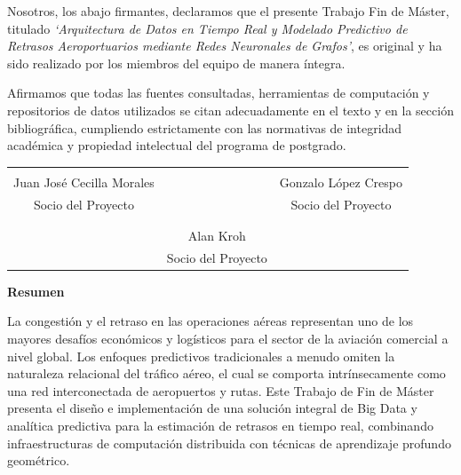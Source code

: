 \documentclass[12pt,oneside,a4paper]{report}
\renewcommand{\_}{\textunderscore\allowbreak}
\begin{document}
Nosotros, los abajo firmantes, declaramos que el presente Trabajo Fin de Máster, titulado \textit{`Arquitectura de Datos en Tiempo Real y Modelado Predictivo de Retrasos Aeroportuarios mediante Redes Neuronales de Grafos'}, es original y ha sido realizado por los miembros del equipo de manera íntegra.

Afirmamos que todas las fuentes consultadas, herramientas de computación y repositorios de datos utilizados se citan adecuadamente en el texto y en la sección bibliográfica, cumpliendo estrictamente con las normativas de integridad académica y propiedad intelectual del programa de postgrado.

\vspace{2.5cm}

\begin{center}
    \begin{tabular}{ccc}
        \underline{\hspace{5cm}} & \hspace{1cm} & \underline{\hspace{5cm}} \\
        Juan José Cecilla Morales & & Gonzalo López Crespo \\
        Socio del Proyecto & & Socio del Proyecto \\
        \vspace{1.5cm} \\
        & \underline{\hspace{5cm}} & \\
        & Alan Kroh & \\
        & Socio del Proyecto &
    \end{tabular}
\end{center}

\newpage
\thispagestyle{plain}
\begin{center}
    {\Large\bfseries Resumen \par}
\end{center}
\vspace{0.5cm}

La congestión y el retraso en las operaciones aéreas representan uno de los mayores desafíos económicos y logísticos para el sector de la aviación comercial a nivel global. Los enfoques predictivos tradicionales a menudo omiten la naturaleza relacional del tráfico aéreo, el cual se comporta intrínsecamente como una red interconectada de aeropuertos y rutas. Este Trabajo de Fin de Máster presenta el diseño e implementación de una solución integral de Big Data y analítica predictiva para la estimación de retrasos en tiempo real, combinando infraestructuras de computación distribuida con técnicas de aprendizaje profundo geométrico.
\end{document}
